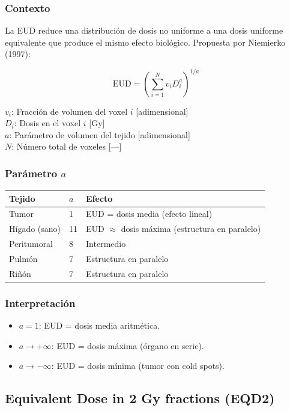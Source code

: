 \documentclass[12pt,a4paper]{article}
\newcommand{\vardef}[2]{\noindent\textbf{#1}: #2\\}
\begin{document}
\subsubsection{Contexto}

La EUD reduce una distribución de dosis no uniforme a una dosis uniforme equivalente que produce el mismo efecto biológico. Propuesta por Niemierko (1997):

$$\text{EUD} = \left(\sum_{i=1}^{N} v_i D_i^a\right)^{1/a}$$

\vardef{$v_i$}{Fracción de volumen del voxel $i$ [adimensional]}
\vardef{$D_i$}{Dosis en el voxel $i$ [Gy]}
\vardef{$a$}{Parámetro de volumen del tejido [adimensional]}
\vardef{$N$}{Número total de voxeles [---]}

\subsubsection{Parámetro $a$}

\begin{tabular}{p{4cm} p{3cm} p{5cm}}
\toprule
\textbf{Tejido} & $a$ & \textbf{Efecto} \\
\midrule
Tumor & 1 & EUD = dosis media (efecto lineal) \\
Hígado (sano) & 11 & EUD $\approx$ dosis máxima (estructura en paralelo) \\
Peritumoral & 8 & Intermedio \\
Pulmón & 7 & Estructura en paralelo \\
Riñón & 7 & Estructura en paralelo \\
\bottomrule
\end{tabular}

\subsubsection{Interpretación}

\begin{itemize}
  \item $a = 1$: EUD = dosis media aritmética.
  \item $a \to +\infty$: EUD = dosis máxima (órgano en serie).
  \item $a \to -\infty$: EUD = dosis mínima (tumor con cold spots).
\end{itemize}

\subsection{Equivalent Dose in 2 Gy fractions (EQD2)}
\end{document}
